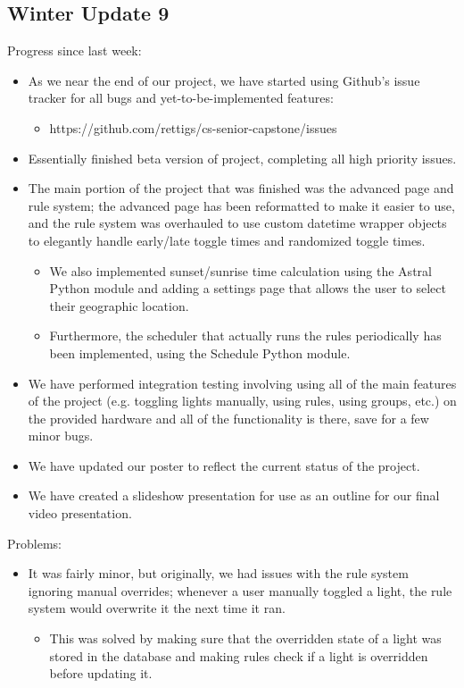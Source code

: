 \subsection{Winter Update 9}
Progress since last week:
\begin{itemize}
\item As we near the end of our project, we have started using Github's issue tracker for all bugs and yet-to-be-implemented features:
\begin{itemize}
\item https://github.com/rettigs/cs-senior-capstone/issues
\end{itemize}
\item Essentially finished beta version of project, completing all high priority issues.
\item The main portion of the project that was finished was the advanced page and rule system; the advanced page has been reformatted to make it easier to use, and the rule system was overhauled to use custom datetime wrapper objects to elegantly handle early/late toggle times and randomized toggle times.
\begin{itemize}
\item We also implemented sunset/sunrise time calculation using the Astral Python module and adding a settings page that allows the user to select their geographic location.
\item Furthermore, the scheduler that actually runs the rules periodically has been implemented, using the Schedule Python module.
\end{itemize}
\item We have performed integration testing involving using all of the main features of the project (e.g. toggling lights manually, using rules, using groups, etc.) on the provided hardware and all of the functionality is there, save for a few minor bugs.
\item We have updated our poster to reflect the current status of the project.
\item We have created a slideshow presentation for use as an outline for our final video presentation.
\end{itemize}
Problems:
\begin{itemize}
\item It was fairly minor, but originally, we had issues with the rule system ignoring manual overrides; whenever a user manually toggled a light, the rule system would overwrite it the next time it ran.
\begin{itemize}
\item This was solved by making sure that the overridden state of a light was stored in the database and making rules check if a light is overridden before updating it.
\end{itemize}
\end{itemize}
